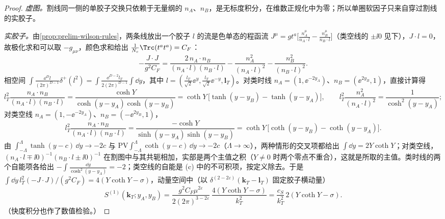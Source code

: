 \begin{proof}
\emph{虚图。}割线同一侧的单胶子交换只依赖于无量纲的 $n_A$、$n_B$，是无标度积分，在维数正规化中为零；所以单圈软因子只来自穿过割线的实胶子。

\emph{实胶子。}由\cref{prop:prelim-wilson-rules}，两条线放出一个胶子 $l$ 的流是色单态的程函流 $J^\mu=g t^a\big[\frac{n_A^\mu}{n_A\cdot l}-\frac{n_B^\mu}{n_B\cdot l}\big]$（类空线的 $\pm\ii0$ 见下），$J\cdot l=0$，故极化求和可以取 $-g_{\mu\nu}$，颜色求和给出 $\frac1{N_c}\Trc(t^at^a)=C_F$：
\[
-\frac{J\cdot J}{g^2C_F}=\frac{2\,n_A\cdot n_B}{(n_A\cdot l)(n_B\cdot l)}-\frac{n_A^2}{(n_A\cdot l)^2}-\frac{n_B^2}{(n_B\cdot l)^2}.
\]
相空间 $\int\frac{\dd^Dl}{(2\pi)^{D-1}}\delta^+(l^2)=\int\frac{\dd^{D-2}l_T}{2(2\pi)^{D-1}}\int\dd y$，其中 $l=(\frac{l_T}{\sqrt2}\ee^{y},\frac{l_T}{\sqrt2}\ee^{-y},\mathbf l_T)$。对类时线 $n_A=(1,\ee^{-2y_A})$、$n_B=(\ee^{2y_B},1)$，直接计算得
\[
l_T^2\frac{n_A\cdot n_B}{(n_A\cdot l)(n_B\cdot l)}=\frac{\cosh Y}{\cosh(y-y_A)\cosh(y-y_B)}=\coth Y\,\big[\tanh(y-y_B)-\tanh(y-y_A)\big],\qquad l_T^2\frac{n_A^2}{(n_A\cdot l)^2}=\frac1{\cosh^2(y-y_A)};
\]
对类空线 $n_A=(1,-\ee^{-2y_A})$、$n_B=(-\ee^{2y_B},1)$，
\[
l_T^2\frac{n_A\cdot n_B}{(n_A\cdot l)(n_B\cdot l)}=\frac{-\cosh Y}{\sinh(y-y_A)\sinh(y-y_B)}=\coth Y\,\big[\coth(y-y_B)-\coth(y-y_A)\big].
\]
由 $\int_{-\Lambda}^{\Lambda}\tanh(y-c)\,\dd y\to-2c$ 与 $\mathrm{PV}\!\int_{-\Lambda}^{\Lambda}\coth(y-c)\,\dd y\to-2c$（$\Lambda\to\infty$），两种情形的交叉项都给出 $\int\dd y=2Y\coth Y$；对类空线，$(n_A\cdot l\mp\ii0)^{-1}(n_B\cdot l\pm\ii0)^{-1}$ 在割图中与其共轭相加，实部是两个主值之积（$Y\neq0$ 时两个零点不重合），这就是所取的主值。类时线的两个自能项各给出 $-\int\frac{\dd y}{\cosh^2(y-y_A)}=-2$；类空线的自能是 (c) 中的不可积项，按定义除去。于是 $\int\dd y\,l_T^2(-J\cdot J)/(g^2C_F)=4(Y\coth Y-\sigma)$，动量空间中（以 $\delta^{(2-2\varepsilon)}(\mathbf k_T-\mathbf l_T)$ 固定胶子横动量）
\begin{equation}\label{eq:tmd-S1-kspace}
S^{(1)}(\mathbf k_T;y_A,y_B)=\frac{g^2C_F\mu^{2\varepsilon}}{2(2\pi)^{3-2\varepsilon}}\,\frac{4(Y\coth Y-\sigma)}{k_T^2}=\frac{c_S}{k_T^2}\,2(Y\coth Y-\sigma).
\end{equation}
（快度积分也作了数值检验。）%


\end{proof}
